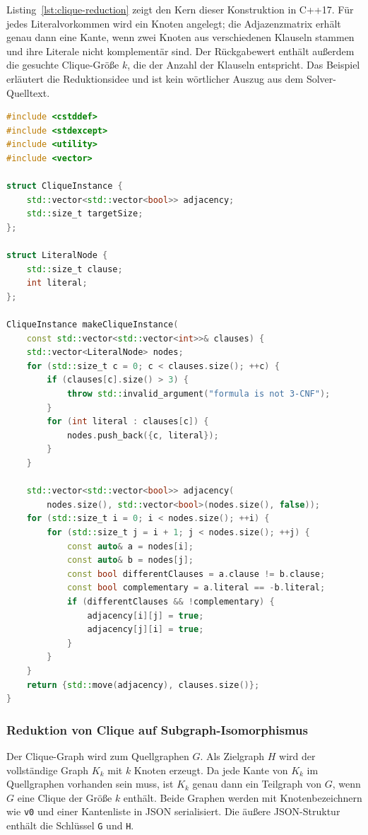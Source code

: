 \documentclass[a4paper,12pt]{article}
\theoremstyle{definition}
\begin{document}
Listing~\ref{lst:clique-reduction} zeigt den Kern dieser Konstruktion in C++17. Für jedes Literalvorkommen wird ein Knoten angelegt; die Adjazenzmatrix erhält genau dann eine Kante, wenn zwei Knoten aus verschiedenen Klauseln stammen und ihre Literale nicht komplementär sind. Der Rückgabewert enthält außerdem die gesuchte Clique-Größe $k$, die der Anzahl der Klauseln entspricht. Das Beispiel erläutert die Reduktionsidee und ist kein wörtlicher Auszug aus dem Solver-Quelltext.

\begin{lstlisting}[language=C++, caption={Didaktischer C++17-Auszug: Konstruktion der Clique-Instanz aus einer 3-CNF-Formel}, label={lst:clique-reduction}]
#include <cstddef>
#include <stdexcept>
#include <utility>
#include <vector>

struct CliqueInstance {
    std::vector<std::vector<bool>> adjacency;
    std::size_t targetSize;
};

struct LiteralNode {
    std::size_t clause;
    int literal;
};

CliqueInstance makeCliqueInstance(
    const std::vector<std::vector<int>>& clauses) {
    std::vector<LiteralNode> nodes;
    for (std::size_t c = 0; c < clauses.size(); ++c) {
        if (clauses[c].size() > 3) {
            throw std::invalid_argument("formula is not 3-CNF");
        }
        for (int literal : clauses[c]) {
            nodes.push_back({c, literal});
        }
    }

    std::vector<std::vector<bool>> adjacency(
        nodes.size(), std::vector<bool>(nodes.size(), false));
    for (std::size_t i = 0; i < nodes.size(); ++i) {
        for (std::size_t j = i + 1; j < nodes.size(); ++j) {
            const auto& a = nodes[i];
            const auto& b = nodes[j];
            const bool differentClauses = a.clause != b.clause;
            const bool complementary = a.literal == -b.literal;
            if (differentClauses && !complementary) {
                adjacency[i][j] = true;
                adjacency[j][i] = true;
            }
        }
    }
    return {std::move(adjacency), clauses.size()};
}
\end{lstlisting}

\subsubsection{Reduktion von Clique auf Subgraph-Isomorphismus}

Der Clique-Graph wird zum Quellgraphen $G$. Als Zielgraph $H$ wird der vollständige Graph $K_k$ mit $k$ Knoten erzeugt. Da jede Kante von $K_k$ im Quellgraphen vorhanden sein muss, ist $K_k$ genau dann ein Teilgraph von $G$, wenn $G$ eine Clique der Größe $k$ enthält. Beide Graphen werden mit Knotenbezeichnern wie \texttt{v0} und einer Kantenliste in JSON serialisiert. Die äußere JSON-Struktur enthält die Schlüssel \texttt{G} und \texttt{H}.
\end{document}
